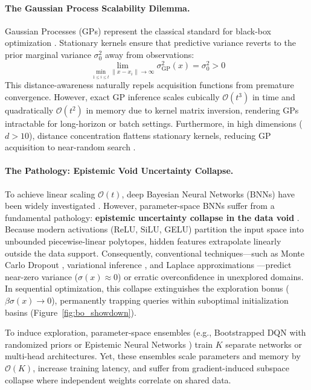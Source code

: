 \documentclass{article}
\begin{document}
\paragraph{The Gaussian Process Scalability Dilemma.}
Gaussian Processes (GPs) represent the classical standard for black-box optimization \citep{rasmussen2006gaussian,srinivas2010gaussian}. Stationary kernels ensure that predictive variance reverts to the prior marginal variance $\sigma_0^2$ away from observations:
\begin{equation}
\label{eq:gp_extrap}
\lim_{\min_{1 \le i \le t} \|x - x_i\| \to \infty} \sigma_{\mathrm{GP}}^2(x) = \sigma_0^2 > 0
\end{equation}
This distance-awareness naturally repels acquisition functions from premature convergence. However, exact GP inference scales cubically $\mathcal{O}(t^3)$ in time and quadratically $\mathcal{O}(t^2)$ in memory due to kernel matrix inversion, rendering GPs intractable for long-horizon or batch settings. Furthermore, in high dimensions ($d > 10$), distance concentration flattens stationary kernels, reducing GP acquisition to near-random search \citep{wang2018batched,eriksson2019scalable}.

\paragraph{The Pathology: Epistemic Void Uncertainty Collapse.}
To achieve linear scaling $\mathcal{O}(t)$, deep Bayesian Neural Networks (BNNs) have been widely investigated \citep{snoek2015scalable,springenberg2016bayesian}. However, parameter-space BNNs suffer from a fundamental pathology: \textbf{epistemic uncertainty collapse in the data void} \citep{foong2019inbetween,hein2019why,ober2021promises}. Because modern activations (ReLU, SiLU, GELU) partition the input space into unbounded piecewise-linear polytopes, hidden features extrapolate linearly outside the data support. Consequently, conventional techniques---such as Monte Carlo Dropout \citep{gal2016dropout}, variational inference \citep{blundell2015weight}, and Laplace approximations \citep{daxberger2021laplace}---predict near-zero variance ($\sigma(x) \approx 0$) or erratic overconfidence in unexplored domains. In sequential optimization, this collapse extinguishes the exploration bonus ($\beta \sigma(x) \to 0$), permanently trapping queries within suboptimal initialization basins (Figure~\ref{fig:bo_showdown}).

To induce exploration, parameter-space ensembles (e.g., Bootstrapped DQN with randomized priors \citep{osband2018randomized} or Epistemic Neural Networks \citep{osband2021epistemic}) train $K$ separate networks or multi-head architectures. Yet, these ensembles scale parameters and memory by $\mathcal{O}(K)$, increase training latency, and suffer from gradient-induced subspace collapse where independent weights correlate on shared data.
\end{document}
